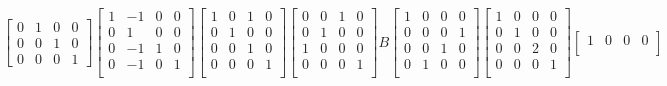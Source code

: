 \documentclass[12pt]{article}
\makeatletter
\theoremstyle{homework}
\newenvironment{exercise}[1]
{\def\@currentlabel{#1}\exercisecore}
{\endexercisecore}
\makeatother
\begin{document}
\begin{exercise}{4}
\begin{enumerate}
        \begin{equation*}
            \begin{bmatrix}
                0 & 1 & 0 & 0\\
                0 & 0 & 1 & 0\\
                0 & 0 & 0 & 1
            \end{bmatrix}
            \begin{bmatrix}
                1 & -1 & 0 & 0\\
                0 & 1 & 0 & 0\\
                0 & -1 & 1 & 0\\
                0 & -1 & 0 & 1\\
            \end{bmatrix}
            \begin{bmatrix}
                1 & 0 & 1 & 0\\
                0 & 1 & 0 & 0\\
                0 & 0 & 1 & 0\\
                0 & 0 & 0 & 1\\
            \end{bmatrix}
            \begin{bmatrix}
                0 & 0 & 1 & 0\\
                0 & 1 & 0 & 0\\
                1 & 0 & 0 & 0\\
                0 & 0 & 0 & 1\\
            \end{bmatrix}
            B
            \begin{bmatrix}
                1 & 0 & 0 & 0\\
                0 & 0 & 0 & 1\\
                0 & 0 & 1 & 0\\
                0 & 1 & 0 & 0\\
            \end{bmatrix}
            \begin{bmatrix}
                1 & 0 & 0 & 0\\
                0 & 1 & 0 & 0\\
                0 & 0 & 2 & 0\\
                0 & 0 & 0 & 1\\
            \end{bmatrix}
            \begin{bmatrix}
                1 & 0 & 0 & 0\\

\end{bmatrix}
\end{equation*}
\end{enumerate}
\end{exercise}
\end{document}

